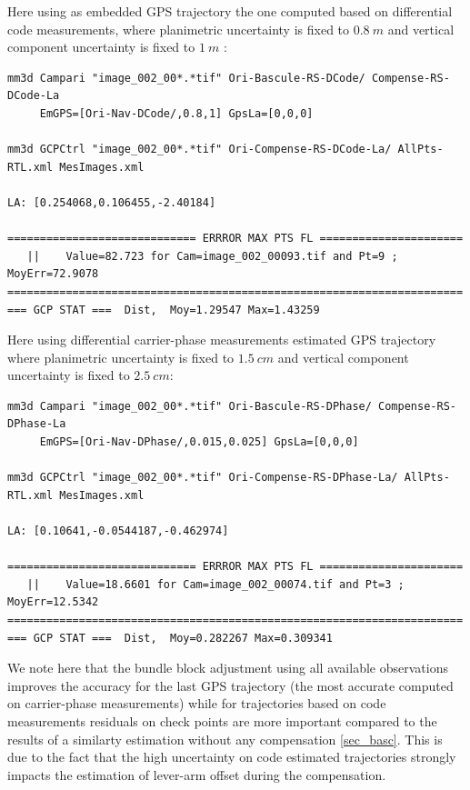 Here using as embedded GPS trajectory the one computed based on differential code measurements, where planimetric uncertainty is fixed to $0.8\ m$ and vertical component uncertainty is fixed to $1\ m$ :

\begin{verbatim}
mm3d Campari "image_002_00*.*tif" Ori-Bascule-RS-DCode/ Compense-RS-DCode-La 
     EmGPS=[Ori-Nav-DCode/,0.8,1] GpsLa=[0,0,0]
     
mm3d GCPCtrl "image_002_00*.*tif" Ori-Compense-RS-DCode-La/ AllPts-RTL.xml MesImages.xml

LA: [0.254068,0.106455,-2.40184]

============================= ERRROR MAX PTS FL ======================
   ||    Value=82.723 for Cam=image_002_00093.tif and Pt=9 ; MoyErr=72.9078
======================================================================
=== GCP STAT ===  Dist,  Moy=1.29547 Max=1.43259
\end{verbatim}


Here using differential carrier-phase measurements estimated GPS trajectory where planimetric uncertainty is fixed to $1.5\ cm$ and vertical component uncertainty is fixed to $2.5\ cm$:
\begin{verbatim}
mm3d Campari "image_002_00*.*tif" Ori-Bascule-RS-DPhase/ Compense-RS-DPhase-La 
     EmGPS=[Ori-Nav-DPhase/,0.015,0.025] GpsLa=[0,0,0]
     
mm3d GCPCtrl "image_002_00*.*tif" Ori-Compense-RS-DPhase-La/ AllPts-RTL.xml MesImages.xml

LA: [0.10641,-0.0544187,-0.462974]

============================= ERRROR MAX PTS FL ======================
   ||    Value=18.6601 for Cam=image_002_00074.tif and Pt=3 ; MoyErr=12.5342
======================================================================
=== GCP STAT ===  Dist,  Moy=0.282267 Max=0.309341
\end{verbatim}



We note here that the bundle block adjustment using all available observations improves the accuracy for the last GPS trajectory (the most accurate computed on carrier-phase measurements) while for trajectories based on code measurements residuals on check points are more important compared to the results of a similarty estimation without any compensation \ref{sec_basc}. This is due to the fact that the high uncertainty on code estimated trajectories strongly impacts the estimation of lever-arm offset during the compensation.
